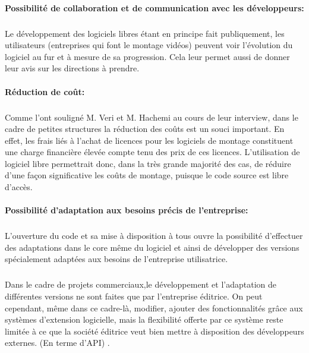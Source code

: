 \paragraph{Possibilité de collaboration et de communication avec les
développeurs:}

  \subparagraph{}

  Le développement des logiciels libres étant en principe fait
  publiquement, les utilisateurs (entreprises qui font le montage
  vidéos) peuvent voir l'évolution du logiciel au fur et à mesure
  de sa progression. Cela leur permet aussi de donner leur avis sur les
  directions à prendre.

\paragraph{Réduction de coût:}

\subparagraph{}

Comme l'ont souligné  M. Veri et M. Hachemi au cours de leur interview,
dans le cadre de petites structures la réduction des coûts est un
souci important.  En effet, les frais liés à l'achat de licences pour
les logiciels de montage constituent une charge financière élevée
compte tenu des prix de ces licences. L'utilisation de logiciel libre
permettrait donc, dans la très grande majorité des cas, de réduire
d'une façon significative les coûts de montage, puisque le code source
est libre d'accès.

\paragraph{Possibilité d'adaptation aux besoins précis de l'entreprise:}

\subparagraph{}

L'ouverture du code et sa mise à disposition à tous ouvre la
possibilité d'effectuer des adaptations dans le core même du logiciel
et ainsi de développer des versions spécialement adaptées aux besoins
de l'entreprise utilisatrice.

\subparagraph{}

Dans le cadre de projets commerciaux,le développement et l'adaptation de
différentes versions ne sont faites que par l'entreprise éditrice. On
peut cependant, même dans ce cadre-là, modifier, ajouter des
fonctionnalités grâce aux systèmes d'extension logicielle, mais
la flexibilité offerte par ce système reste limitée à ce que la
société éditrice veut bien mettre à disposition des développeurs
externes. (En terme d'API)  .

